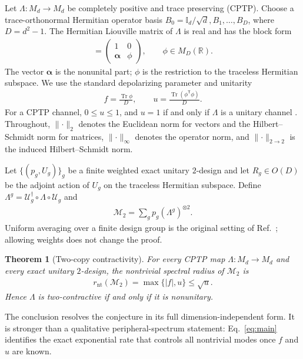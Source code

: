 \documentclass[aps,prl,reprint,superscriptaddress,nofootinbib]{revtex4-2}
\newtheorem{theorem}{Theorem}
\newcommand{\Tr}{\operatorname{Tr}}
\newcommand{\id}{\mathbb{I}}
\newcommand{\cM}{\mathcal{M}}
\newcommand{\cU}{\mathcal{U}}
\begin{document}
Let $\Lambda:M_d\to M_d$ be completely positive and trace preserving (CPTP).
Choose a trace-orthonormal Hermitian operator basis
$B_0=\id_d/\sqrt d,B_1,\ldots,B_D$, where $D=d^2-1$.  The Hermitian Liouville
matrix of $\Lambda$ is real and has the block form
\begin{align}
 [\Lambda]=
 \begin{pmatrix}
 1&0\\
 \bm{\alpha}&\phi
 \end{pmatrix},
 \qquad \phi\in M_D(\mathbb R).
 \label{eq:liouville}
\end{align}
The vector $\bm{\alpha}$ is the nonunital part; $\phi$ is the restriction to
the traceless Hermitian subspace.  We use the standard depolarizing parameter
and unitarity
\begin{align}
 f=\frac{\Tr\phi}{D},
 \qquad
 u=\frac{\Tr(\phi^{\mathsf T}\phi)}{D}.
 \label{eq:fu}
\end{align}
For a CPTP channel, $0\leq u\leq1$, and $u=1$ if and only if $\Lambda$ is a
unitary channel \cite{WallmanEtAl2015}.
Throughout, $\lVert\cdot\rVert_2$ denotes the Euclidean norm for vectors and
the Hilbert--Schmidt norm for matrices, $\lVert\cdot\rVert_\infty$ denotes the
operator norm, and $\lVert\cdot\rVert_{2\to2}$ is the induced
Hilbert--Schmidt norm.

Let $\{(p_g,U_g)\}_g$ be a finite weighted exact unitary $2$-design and let
$R_g\in O(D)$ be the adjoint action of $U_g$ on the traceless Hermitian
subspace.  Define $\Lambda^g=\cU_g^\dagger\circ\Lambda\circ\cU_g$ and
\begin{align}
 \cM_2=\sum_g p_g(\Lambda^g)^{\otimes2}.
 \label{eq:twirl}
\end{align}
Uniform averaging over a finite design group is the original setting of
Ref.~\cite{WallmanFlammia2014}; allowing weights does not change the proof.

\begin{theorem}[Two-copy contractivity]
For every CPTP map $\Lambda:M_d\to M_d$ and every exact unitary $2$-design,
the nontrivial spectral radius of $\cM_2$ is
\begin{align}
 r_{\mathrm{nt}}(\cM_2)=\max\{|f|,u\}\leq\sqrt{u}.
 \label{eq:main}
\end{align}
Hence $\Lambda$ is two-contractive if and only if it is nonunitary.
\end{theorem}

The conclusion resolves the conjecture in its full dimension-independent
form.  It is stronger than a qualitative peripheral-spectrum statement:
Eq.~\eqref{eq:main} identifies the exact exponential rate that controls all
nontrivial modes once $f$ and $u$ are known.
\end{document}

